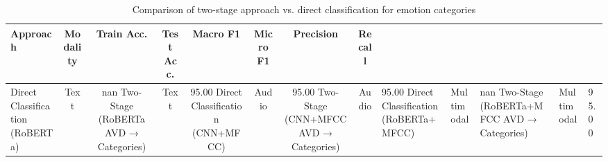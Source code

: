 \begin{table}[h]
\centering
\caption{Comparison of two-stage approach vs. direct classification for emotion categories}
\label{tab:categorical_mapping}
\begin{tabular}{|l|c|c|c|c|c|c|c|}
\hline
\textbf{Approach} & \textbf{Modality} & \textbf{Train Acc.} & \textbf{Test Acc.} & \textbf{Macro F1} & \textbf{Micro F1} & \textbf{Precision} & \textbf{Recall} \\
\hline
Direct Classification (RoBERTa) & Text & nan%
\hline
Two-Stage (RoBERTa AVD → Categories) & Text & 95.00%
\hline
Direct Classification (CNN+MFCC) & Audio & 95.00%
\hline
Two-Stage (CNN+MFCC AVD → Categories) & Audio & 95.00%
\hline
Direct Classification (RoBERTa+MFCC) & Multimodal & nan%
\hline
Two-Stage (RoBERTa+MFCC AVD → Categories) & Multimodal & 95.00%
\hline
\end{tabular}
\end{table}
